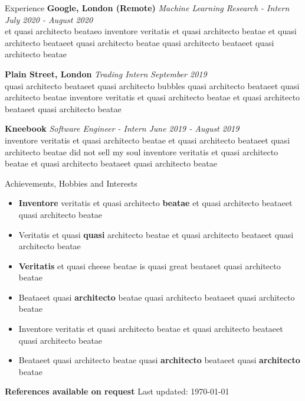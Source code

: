 \documentclass[options]{resume}
\begin{document}
	\begin{rSection}{Experience}
		{\bf Google, London (Remote)}
		 \textit{Machine Learning Research - Intern}
		 \hfill {\em July 2020 - August 2020} 
		 \\ et quasi architecto beataeo inventore veritatis et quasi architecto beatae et quasi architecto beataeet quasi architecto beatae quasi architecto beataeet quasi architecto beatae 
		
		{\bf Plain Street, London} 
		 \textit{Trading Intern} 
		 \hfill {\em September 2019}
		\\ quasi architecto beataeet quasi architecto bubbles quasi architecto beataeet quasi architecto beatae inventore veritatis et quasi architecto beatae et quasi architecto beataeet quasi architecto beatae 
		
		{\bf Kneebook} 
		\textit{Software Engineer - Intern}
		\hfill {\em June 2019 - August 2019} 
		\\ inventore veritatis et quasi architecto beatae et quasi architecto beataeet quasi architecto beatae did not sell my soul inventore veritatis et quasi architecto beatae et quasi architecto beataeet quasi architecto beatae 
	\end{rSection}

	\begin{rSection}{Achievements, Hobbies and Interests}
		\begin{itemize}[noitemsep, leftmargin=*]
			\item[\textperiodcentered] \textbf{Inventore} veritatis et quasi architecto \textbf{beatae} et quasi architecto beataeet quasi architecto beatae 
			\item[\textperiodcentered] Veritatis et quasi \textbf{quasi} architecto beatae et quasi architecto beataeet quasi architecto beatae 
			\item[\textperiodcentered] \textbf{Veritatis} et quasi cheese beatae is quasi great beataeet quasi architecto beatae 
			\item[\textperiodcentered] Beataeet quasi \textbf{architecto} beatae quasi architecto beataeet quasi architecto beatae 
			\item[\textperiodcentered] Inventore veritatis et quasi architecto beatae et quasi architecto beataeet quasi architecto beatae 
			\item[\textperiodcentered] Beataeet quasi architecto beatae quasi \textbf{architecto} beataeet quasi \textbf{architecto} beatae 

		\end{itemize}
	\end{rSection}
{\textbf{References available on request} \hfill Last updated: \today}
\end{document}

